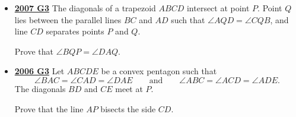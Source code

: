 \documentclass[11pt]{scrartcl}
\begin{document}
\begin{itemize}[leftmargin=*]
Show that the quadrilateral $ ABCD$ is cyclic.
\item \href{https://artofproblemsolving.com/community/c6h214644p1186774}{\textbf{2007 G3}} The diagonals of a trapezoid $ ABCD$ intersect at point $ P$. Point $ Q$ lies between the parallel lines $ BC$ and $ AD$ such that $ \angle AQD = \angle CQB$, and line $ CD$ separates points $ P$ and $ Q$. 

Prove that $ \angle BQP = \angle DAQ$.
\item \href{https://artofproblemsolving.com/community/c6h130813p741369}{\textbf{2006 G3}} Let $ ABCDE$ be a convex pentagon such that \[ \angle BAC = \angle CAD = \angle DAE\qquad \text{and}\qquad \angle ABC = \angle ACD = \angle ADE.\] The diagonals $BD$ and $CE$ meet at $P$. 

Prove that the line $AP$ bisects the side $CD$.
\end{itemize}
\newpage
\end{document}
